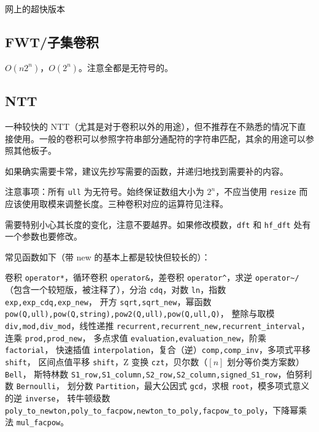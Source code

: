 \documentclass[12pt]{ctexart}
\begin{document}
网上的超快版本



\subsection{FWT/子集卷积}

$O(n2^n)$，$O(2^n)$。注意全都是无符号的。



\subsection{NTT}

一种较快的 NTT（尤其是对于卷积以外的用途），但不推荐在不熟悉的情况下直接使用。一般的卷积可以参照字符串部分通配符的字符串匹配，其余的用途可以参照其他板子。

如果确实需要卡常，建议先抄写需要的函数，并递归地找到需要补的内容。

注意事项：所有 \verb|ull| 为无符号。始终保证数组大小为 $2^n$，不应当使用 \verb|resize| 而应该使用取模来调整长度。三种卷积对应的运算符见注释。

需要特别小心其长度的变化，注意不要越界。如果修改模数，\verb|dft| 和 \verb|hf_dft| 处有一个参数也要修改。

常见函数如下（带 new 的基本上都是较快但较长的）：

卷积 \verb|operator*|，循环卷积 \verb|operator&|，差卷积 \verb|operator^|，求逆 \verb|operator~/|
（包含一个较短版，被注释了），分治 \verb|cdq|，对数 \verb|ln|，指数 \verb|exp,exp_cdq,exp_new|，
开方 \verb|sqrt,sqrt_new|，幂函数 \verb|pow(Q,ull),pow(Q,string),pow2(Q,ull),pow(Q,ull,Q)|，
整除与取模 \verb|div,mod,div_mod|，线性递推 \verb|recurrent,recurrent_new,recurrent_interval|，
连乘 \verb|prod,prod_new|，\newline
多点求值 \verb|evaluation,evaluation_new|，阶乘 \verb|factorial|，
快速插值 \verb|interpolation|，复合（逆）\verb|comp,comp_inv|，多项式平移 \verb|shift|，
区间点值平移 \verb|shift|，Z 变换 \verb|czt|，贝尔数（$[n]$ 划分等价类方案数）\verb|Bell|，
斯特林数 \verb|S1_row,S1_column,S2_row,S2_column,signed_S1_row|，伯努利数 \verb|Bernoulli|，
划分数 \verb|Partition|，最大公因式 \verb|gcd|，求根 \verb|root|，模多项式意义的逆 \verb|inverse|，
转牛顿级数 \verb|poly_to_newton,poly_to_facpow,newton_to_poly,facpow_to_poly|，下降幂乘法 \verb|mul_facpow|。


\end{document}
